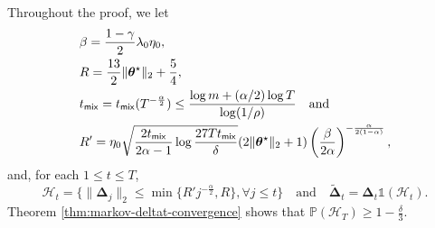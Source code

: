 Throughout the proof, we let
\begin{align*}
&\beta = \frac{1-\gamma}{2}\lambda_0 \eta_0,\\ 
& R = \frac{13}{2}\|\bm{\theta}^\star\|_2 + \frac{5}{4}, \\ 
&t_{\mathsf{mix}} = t_{\mathsf{mix}}(T^{-\frac{\alpha}{2}}) \leq \frac{\log m + (\alpha/2)\log T}{\log(1/\rho)} \quad \text{and}\\ 
&R' = \eta_0 \sqrt{\frac{2t_{\mathsf{mix}}}{2\alpha-1}\log \frac{27Tt_{\mathsf{mix}}}{\delta}} (2\|\bm{\theta}^\star\|_2+1)\left(\frac{\beta}{2\alpha}\right)^{-\frac{\alpha}{2(1-\alpha)}}, 
\end{align*}
and, for each $1 \leq t \leq T$,
\[
\mathcal{H}_t = \Big\{ \|\bm{\Delta}_j\|_2 \leq \min\{R'j^{-\frac{\alpha}{2}},R\}, \forall j \leq t \Big\} \quad \text{and} \quad \tilde{\bm{\Delta}}_t = \bm{\Delta}_t \mathds{1}(\mathcal{H}_t).
\]
Theorem \ref{thm:markov-deltat-convergence} shows that $\mathbb{P}(\mathcal{H}_T) \geq 1-\frac{\delta}{3}$.
